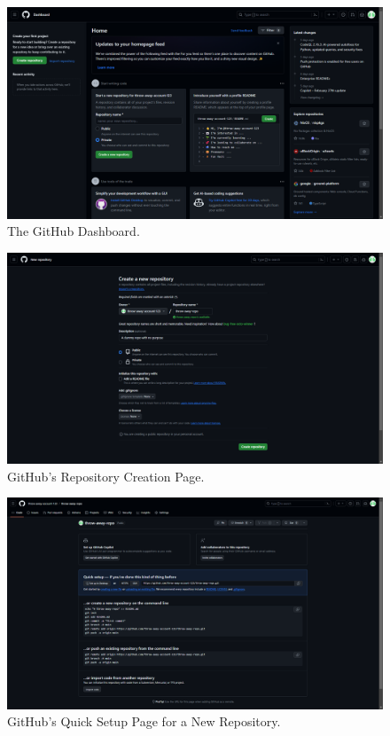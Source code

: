 \documentclass{article}
\begin{document}
\begin{figure}[p]
	\centering
	\includegraphics[width=\textwidth]{homepage.png}
	\caption{The GitHub Dashboard.}
	\label{fig:homepage}
\end{figure}

\begin{figure}[p]
	\centering
	\includegraphics[width=\textwidth]{new-repo.png}
	\caption{GitHub's Repository Creation Page.}
	\label{fig:new-repo}
\end{figure}

\begin{figure}[p]
	\centering
	\includegraphics[width=\textwidth]{quick-setup.png}
	\caption{GitHub's Quick Setup Page for a New Repository.}
	\label{fig:quick-setup}
\end{figure}
\end{document}
